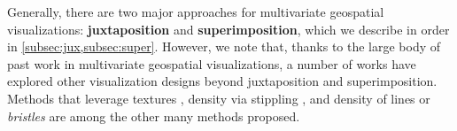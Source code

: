 
Generally, there are two major approaches for multivariate geospatial visualizations: \textbf{juxtaposition} and \textbf{superimposition}, which we describe in order in \cref{subsec:jux,subsec:super}.
%
However, we note that, thanks to the large body of past work in multivariate geospatial visualizations, a number of works have explored other visualization designs beyond juxtaposition and superimposition.
%
Methods that leverage textures \cite{maceachren1998visualizing}, density via stippling \cite{gortler_stippling_2019}, and density of lines or \textit{bristles} \cite{kim_bristle_2013} are among the other many methods proposed.


